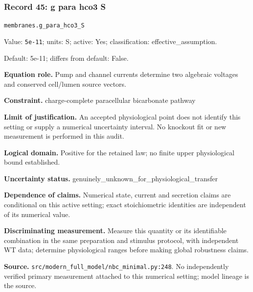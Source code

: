 \subsubsection*{Record 45: g para hco3 S}
{\small \nolinkurl{membranes.g_para_hco3_S}\par

Value: \texttt{5e-11}; units: S; active: Yes; classification: effective\_assumption.\par

Default: 5e-11; differs from default: False.\par

\textbf{Equation role.} Pump and channel currents determine two algebraic voltages and conserved cell/lumen source vectors.\par

\textbf{Constraint.} charge-complete paracellular bicarbonate pathway\par

\textbf{Limit of justification.} An accepted physiological point does not identify this setting or supply a numerical uncertainty interval. No knockout fit or new measurement is performed in this audit.\par

\textbf{Logical domain.} Positive for the retained law; no finite upper physiological bound established.\par

\textbf{Uncertainty status.} genuinely\_unknown\_for\_physiological\_transfer\par

\textbf{Dependence of claims.} Numerical state, current and secretion claims are conditional on this active setting; exact stoichiometric identities are independent of its numerical value.\par

\textbf{Discriminating measurement.} Measure this quantity or its identifiable combination in the same preparation and stimulus protocol, with independent WT data; determine physiological ranges before making global robustness claims.\par

\textbf{Source.} \nolinkurl{src/modern_full_model/nbc_minimal.py:248}. No independently verified primary measurement attached to this numerical setting; model lineage is the source.\par}

